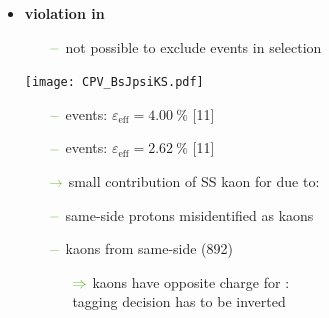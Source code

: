 {\begin{minipage}{0.474\boxwidth}
\begin{itemize}

\item\textbf{\CP violation in \BsToJPsiKS}
	\begin{itemize}
	\setlength\itemsep{0.01em}
	\setlength{\itemindent}{-.11in}
	\item[${\color{tu_gruen}-}$] not possible to exclude \Bd events in selection
	\end{itemize}
	
\vspace{-2.1em}
\begin{flushleft}
\texttt{[image: CPV\_BsJpsiKS.pdf]}
\end{flushleft}
\vspace{-2.2em}

	\begin{itemize}
	\setlength\itemsep{0.01em}
	\setlength{\itemindent}{-.11in}
	\item[${\color{tu_gruen}-}$] \Bs events: $\varepsilon_\text{eff}=\SI{4.00}{\%}$ [11]
	\item[${\color{tu_gruen}-}$] \Bd events: $\varepsilon_\text{eff}=\SI{2.62}{\%}$ [11]
	\setlength{\itemindent}{.05in}
	\item[${\color{tu_gruen}\rightarrow}$] small contribution of SS kaon for \Bd due to:
	\setlength{\itemindent}{.10in}
	\item[${\color{tu_gruen}-}$] same-side protons misidentified as kaons
	\item[${\color{tu_gruen}-}$] kaons from same-side \Kstar(892)
	\vspace{-0.35em}
		\begin{itemize}[leftmargin=.05in]
		\item[${\color{tu_gruen}\Rightarrow}$] kaons have opposite charge for \Bd:\\ tagging decision has to be inverted
		\end{itemize}
	\end{itemize}


%
%
\end{itemize}


\end{minipage}}
